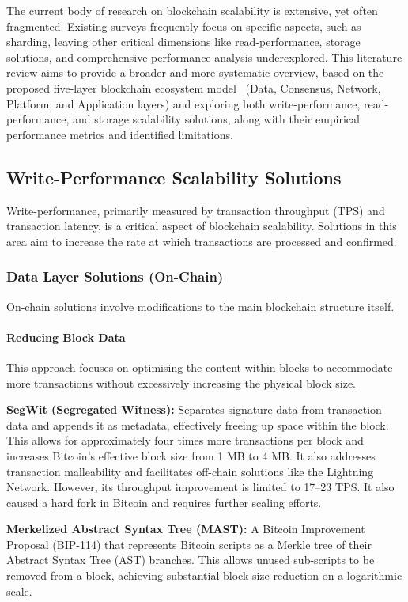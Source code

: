 
The current body of research on blockchain scalability is extensive, yet often fragmented. Existing surveys frequently focus on specific aspects, such as sharding, leaving other critical dimensions like read-performance, storage solutions, and comprehensive performance analysis underexplored. This literature review aims to provide a broader and more systematic overview, based on the proposed five-layer blockchain ecosystem model~\cite{ref1} (Data, Consensus, Network, Platform, and Application layers) and exploring both write-performance, read-performance, and storage scalability solutions, along with their empirical performance metrics and identified limitations.

\subsection{Write-Performance Scalability Solutions}
Write-performance, primarily measured by transaction throughput (TPS) and transaction latency, is a critical aspect of blockchain scalability. Solutions in this area aim to increase the rate at which transactions are processed and confirmed.

\subsubsection{Data Layer Solutions (On-Chain)}
On-chain solutions involve modifications to the main blockchain structure itself.

\paragraph{Reducing Block Data}
This approach focuses on optimising the content within blocks to accommodate more transactions without excessively increasing the physical block size.

\textbf{SegWit (Segregated Witness):} Separates signature data from transaction data and appends it as metadata, effectively freeing up space within the block. This allows for approximately four times more transactions per block and increases Bitcoin's effective block size from 1 MB to 4 MB. It also addresses transaction malleability and facilitates off-chain solutions like the Lightning Network. However, its throughput improvement is limited to 17–23 TPS. It also caused a hard fork in Bitcoin and requires further scaling efforts.

\textbf{Merkelized Abstract Syntax Tree (MAST):} A Bitcoin Improvement Proposal (BIP-114) that represents Bitcoin scripts as a Merkle tree of their Abstract Syntax Tree (AST) branches. This allows unused sub-scripts to be removed from a block, achieving substantial block size reduction on a logarithmic scale.

